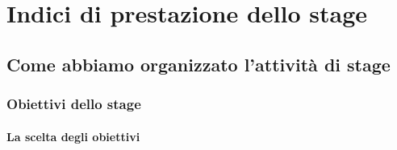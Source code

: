 
\chapter{Indici di prestazione dello stage}
\label{cap:performance-stage}
\section{Come abbiamo organizzato l'attività di stage}
\subsection{Obiettivi dello stage}
\subsubsection{La scelta degli obiettivi}
